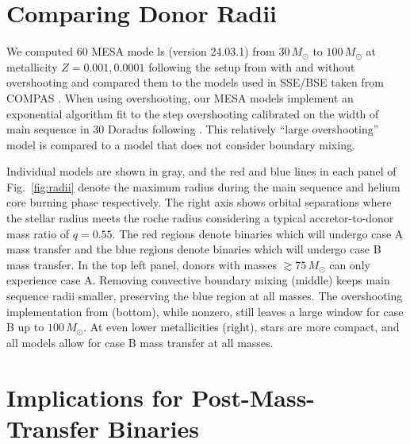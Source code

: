 \documentclass[twocolumn]{aastex63}
\begin{document}
\section{Comparing Donor Radii}

We computed 60 MESA mode ls (version 24.03.1) from $30 \, M_{\odot}$
to $100 \, M_{\odot}$ at metallicity $Z=0.001,0.0001$ following the
setup from \cite{renzo:23} with and without overshooting and compared
them to the \cite{pols:98} models used in SSE/BSE \cite{hurley:00}
taken from COMPAS \cite{stevenson:17, vignagomez:18, riley:22}. When
using overshooting, our MESA models implement an exponential algorithm
\citep{herwig:00} fit to the step overshooting calibrated on the width
of main sequence in 30 Doradus \citep{brott:11} following
\cite{claret:18}. This relatively ``large overshooting'' model is
compared to a model that does not consider boundary mixing.

Individual models are shown in gray, and the red and blue lines in
each panel of Fig.~\ref{fig:radii} denote the maximum radius during
the main sequence and helium core burning phase respectively. The
right axis shows orbital separations where the stellar radius meets
the roche radius \citep{eggleton:83} considering a typical
accretor-to-donor mass ratio of $q=0.55$. The red regions denote
binaries which will undergo case A mass transfer and the blue regions
denote binaries which will undergo case B mass transfer. In the top
left panel, donors with masses $ \gtrsim 75 \, M_{\odot}$ can only
experience case A. Removing convective boundary mixing (middle) keeps
main sequence radii smaller, preserving the blue region at all
masses. The overshooting implementation from \cite{pols:98} (bottom),
while nonzero, still leaves a large window for case B up to
$100 \, M_{\odot}$. At even lower metallicities (right), stars are
more compact, and all models allow for case B mass transfer at all
masses.

\section{Implications for Post-Mass-Transfer Binaries}
\end{document}
